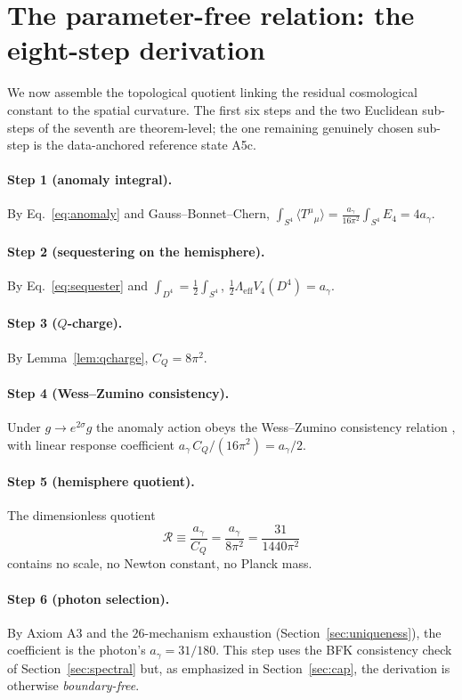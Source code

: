 \documentclass[11pt,a4paper]{article}
\theoremstyle{plain}
\theoremstyle{definition}
\theoremstyle{remark}
\newcommand{\ag}{a_\gamma}
\newcommand{\CQ}{C_Q}
\newcommand{\Rtop}{\mathcal{R}}
\newcommand{\avg}[1]{\langle #1 \rangle}
\begin{document}
\section{The parameter-free relation: the eight-step derivation}
\label{sec:main}

We now assemble the topological quotient linking the residual cosmological constant to the
spatial curvature. The first six steps and the two Euclidean sub-steps of the seventh are
theorem-level; the one remaining genuinely chosen sub-step is the data-anchored reference state A5c.

\paragraph{Step 1 (anomaly integral).} By Eq.~\eqref{eq:anomaly} and Gauss--Bonnet--Chern,
$\int_{S^4}\avg{T^\mu{}_\mu} = \tfrac{\ag}{16\pi^2}\int_{S^4} E_4 = 4\ag$.

\paragraph{Step 2 (sequestering on the hemisphere).} By Eq.~\eqref{eq:sequester} and
$\int_{D^4} = \tfrac12\int_{S^4}$, $\tfrac12\Lambda_{\mathrm{eff}}V_4(D^4) = \ag$.

\paragraph{Step 3 ($Q$-charge).} By Lemma~\ref{lem:qcharge}, $\CQ = 8\pi^2$.

\paragraph{Step 4 (Wess--Zumino consistency).} Under $g \to e^{2\sigma} g$ the anomaly action
obeys the Wess--Zumino consistency relation \cite{Riegert1984}, with linear response
coefficient $\ag\,\CQ/(16\pi^2) = \ag/2$.

\paragraph{Step 5 (hemisphere quotient).} The dimensionless quotient
\begin{equation}
\label{eq:quotient}
\Rtop \equiv \frac{\ag}{\CQ} = \frac{\ag}{8\pi^2} = \frac{31}{1440\pi^2}
\end{equation}
contains no scale, no Newton constant, no Planck mass.

\paragraph{Step 6 (photon selection).} By Axiom A3 and the $26$-mechanism exhaustion
(Section~\ref{sec:uniqueness}), the coefficient is the photon's $\ag = 31/180$. This step uses
the BFK consistency check of Section~\ref{sec:spectral} but, as emphasized in
Section~\ref{sec:cap}, the derivation is otherwise \emph{boundary-free}.
\end{document}
